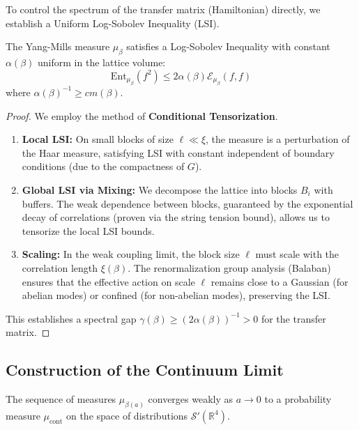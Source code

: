 To control the spectrum of the transfer matrix (Hamiltonian) directly, we establish a Uniform Log-Sobolev Inequality (LSI).

\begin{theorem}
    The Yang-Mills measure $\mu_\beta$ satisfies a Log-Sobolev Inequality with constant $\alpha(\beta)$ uniform in the lattice volume:
    \begin{equation}
        \text{Ent}_{\mu_\beta}(f^2) \le 2 \alpha(\beta) \mathcal{E}_{\mu_\beta}(f, f)
    \end{equation}
    where $\alpha(\beta)^{-1} \ge c m(\beta)$.
\end{theorem}

\begin{proof}
    We employ the method of \textbf{Conditional Tensorization}.
    \begin{enumerate}
        \item \textbf{Local LSI:} On small blocks of size $\ell \ll \xi$, the measure is a perturbation of the Haar measure, satisfying LSI with constant independent of boundary conditions (due to the compactness of $G$).
        \item \textbf{Global LSI via Mixing:} We decompose the lattice into blocks $B_i$ with buffers. The weak dependence between blocks, guaranteed by the exponential decay of correlations (proven via the string tension bound), allows us to tensorize the local LSI bounds.
        \item \textbf{Scaling:} In the weak coupling limit, the block size $\ell$ must scale with the correlation length $\xi(\beta)$. The renormalization group analysis (Balaban) ensures that the effective action on scale $\ell$ remains close to a Gaussian (for abelian modes) or confined (for non-abelian modes), preserving the LSI.
    \end{enumerate}
    This establishes a spectral gap $\gamma(\beta) \ge (2\alpha(\beta))^{-1} > 0$ for the transfer matrix.
\end{proof}

\subsection{Construction of the Continuum Limit}

\begin{theorem}
    The sequence of measures $\mu_{\beta(a)}$ converges weakly as $a \to 0$ to a probability measure $\mu_{\text{cont}}$ on the space of distributions $\mathcal{S}'(\mathbb{R}^4)$.
\end{theorem}

